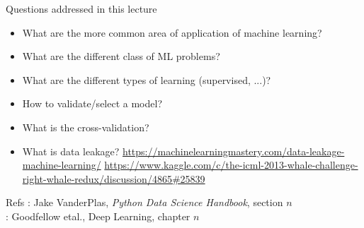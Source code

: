 \documentclass[handout]{beamer}
\begin{document}
\begin{frame}[fragile]{Questions addressed in this lecture}
    \begin{itemize}
        \item What are the more common area of application of machine learning? \cite[1]{Goodfellow-et-al-2016}
        \item What are the different class of ML problems? \cite[5.1]{VanderPlas-2016}
        \item What are the different types of learning (supervised, ...)?  \cite[5.1]{VanderPlas-2016}
        \item How to validate/select a model? \cite[5.3]{VanderPlas-2016}
        \item What is the cross-validation? \cite[5.3]{VanderPlas-2016}
        \item What is data leakage?
        {\footnotesize
        \href{https://machinelearningmastery.com/data-leakage-machine-learning/}{https://machinelearningmastery.com/data-leakage-machine-learning/}
        \href{https://www.kaggle.com/c/the-icml-2013-whale-challenge-right-whale-redux/discussion/4865\#25839}{https://www.kaggle.com/c/the-icml-2013-whale-challenge-right-whale-redux/discussion/4865\#25839}}
    \end{itemize}

\begin{footnotesize}
\begin{block}{Refs}
\cite[$n$]{VanderPlas-2016}: Jake VanderPlas, \textit{Python Data Science Handbook}, section $n$\\
\cite[$n$]{Goodfellow-et-al-2016}: Goodfellow etal., Deep Learning, chapter $n$
\end{block}
\end{footnotesize}
\end{frame}



\end{document}
